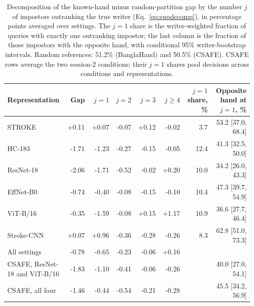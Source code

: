 \begin{table}[ht]
\caption{Decomposition of the known-hand minus random-partition gap by the number $j$ of impostors outranking the true writer (Eq.~\ref{eq:supdecomp}), in percentage points averaged over settings. The $j=1$ share is the writer-weighted fraction of queries with exactly one outranking impostor; the last column is the fraction of those impostors with the opposite hand, with conditional 95\% writer-bootstrap intervals. Random references: 51.2\% (BanglaHand) and 50.5\% (CSAFE). CSAFE rows average the two session-2 conditions; their $j=1$ shares pool decisions across conditions and representations.}\label{tab:decomposition}
\centering\footnotesize\setlength{\tabcolsep}{3pt}
\begin{tabular}{lrrrrrrr}\toprule
Representation & Gap & $j=1$ & $j=2$ & $j=3$ & $j\geq4$ & $j=1$ share, \% & Opposite hand at $j=1$, \%\\\midrule
STROKE & +0.11 & +0.07 & -0.07 & +0.12 & -0.02 & 3.7 & 53.2 [37.0, 68.4] \\
HC-183 & -1.71 & -1.23 & -0.27 & -0.15 & -0.05 & 12.4 & 41.3 [32.5, 50.0] \\
ResNet-18 & -2.06 & -1.71 & -0.52 & -0.02 & +0.20 & 10.0 & 34.2 [26.0, 43.3] \\
EffNet-B0 & -0.74 & -0.40 & -0.08 & -0.15 & -0.10 & 10.4 & 47.3 [39.7, 54.9] \\
ViT-B/16 & -0.35 & -1.59 & -0.08 & +0.15 & +1.17 & 10.9 & 36.6 [27.7, 46.4] \\
Stroke-CNN & +0.07 & +0.96 & -0.36 & -0.28 & -0.26 & 8.3 & 62.8 [51.0, 73.3] \\
\midrule
All settings & -0.78 & -0.65 & -0.23 & -0.06 & +0.16 &  &  \\
\midrule
CSAFE, ResNet-18 and ViT-B/16 & -1.83 & -1.10 & -0.41 & -0.06 & -0.26 &  & 40.0 [27.0, 54.1] \\
CSAFE, all four & -1.46 & -0.44 & -0.54 & -0.21 & -0.28 &  & 45.5 [34.2, 56.9] \\
\bottomrule
\end{tabular}
\end{table}
